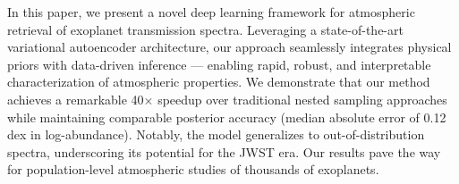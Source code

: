 In this paper, we present a novel deep learning framework for atmospheric retrieval of exoplanet transmission spectra. Leveraging a state-of-the-art variational autoencoder architecture, our approach seamlessly integrates physical priors with data-driven inference — enabling rapid, robust, and interpretable characterization of atmospheric properties. We demonstrate that our method achieves a remarkable 40$\times$ speedup over traditional nested sampling approaches while maintaining comparable posterior accuracy (median absolute error of 0.12 dex in log-abundance). Notably, the model generalizes to out-of-distribution spectra, underscoring its potential for the JWST era. Our results pave the way for population-level atmospheric studies of thousands of exoplanets.
